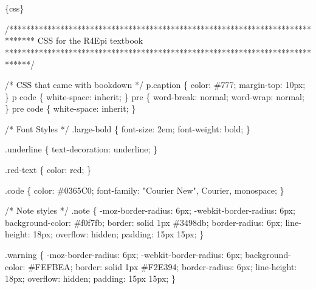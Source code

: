 \documentclass[
  letterpaper,
  DIV=11,
  numbers=noendperiod]{scrreprt}
\newenvironment{Shaded}{\begin{snugshade}}{\end{snugshade}}
\newcommand{\InformationTok}[1]{\textcolor[rgb]{0.37,0.37,0.37}{#1}}
\begin{document}
\begin{Shaded}
\begin{Highlighting}[]
\InformationTok{\textasciigrave{}\textasciigrave{}\textasciigrave{}\{css\}}

\InformationTok{/******************************************************************************}
\InformationTok{CSS for the R4Epi textbook}
\InformationTok{******************************************************************************/}

\InformationTok{/*}
\InformationTok{CSS that came with bookdown}
\InformationTok{*/}
\InformationTok{p.caption \{}
\InformationTok{  color: \#777;}
\InformationTok{  margin{-}top: 10px;}
\InformationTok{\}}
\InformationTok{p code \{}
\InformationTok{  white{-}space: inherit;}
\InformationTok{\}}
\InformationTok{pre \{}
\InformationTok{  word{-}break: normal;}
\InformationTok{  word{-}wrap: normal;}
\InformationTok{\}}
\InformationTok{pre code \{}
\InformationTok{  white{-}space: inherit;}
\InformationTok{\}}

\InformationTok{/* }
\InformationTok{Font Styles}
\InformationTok{*/}
\InformationTok{.large{-}bold \{}
\InformationTok{  font{-}size: 2em;}
\InformationTok{  font{-}weight: bold;}
\InformationTok{\}}

\InformationTok{.underline \{}
\InformationTok{  text{-}decoration: underline;}
\InformationTok{\}}

\InformationTok{.red{-}text \{}
\InformationTok{  color: red;}
\InformationTok{\}}

\InformationTok{.code \{}
\InformationTok{  color: \#0365C0;}
\InformationTok{  font{-}family: "Courier New", Courier, monospace;}
\InformationTok{\}}


\InformationTok{/*}
\InformationTok{Note styles}
\InformationTok{*/}
\InformationTok{.note \{}
\InformationTok{  {-}moz{-}border{-}radius: 6px;}
\InformationTok{  {-}webkit{-}border{-}radius: 6px;}
\InformationTok{  background{-}color: \#f0f7fb;}
\InformationTok{  border: solid 1px \#3498db;}
\InformationTok{  border{-}radius: 6px;}
\InformationTok{  line{-}height: 18px;}
\InformationTok{  overflow: hidden;}
\InformationTok{  padding: 15px 15px;}
\InformationTok{\}}

\InformationTok{.warning \{}
\InformationTok{  {-}moz{-}border{-}radius: 6px;}
\InformationTok{  {-}webkit{-}border{-}radius: 6px;}
\InformationTok{  background{-}color: \#FEFBEA;}
\InformationTok{  border: solid 1px \#F2E394;}
\InformationTok{  border{-}radius: 6px;}
\InformationTok{  line{-}height: 18px;}
\InformationTok{  overflow: hidden;}
\InformationTok{  padding: 15px 15px;}
\InformationTok{\}}



\end{Highlighting}
\end{Shaded}
\end{document}
